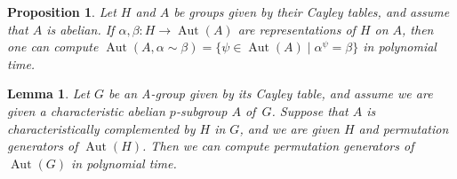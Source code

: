 \documentclass[10pt,a4paper]{amsart}
\newtheorem{proposition}{Proposition}
\newtheorem{lemma}{Lemma}
\DeclareMathOperator{\Aut}{Aut}
\begin{document}
\begin{proposition}\label{pbot}
	Let \( H \) and \( A \) be groups given by their Cayley tables, and assume that \( A \) is abelian.
	If \( \alpha, \beta : H \to \Aut(A) \) are representations of \( H \) on \( A \), then one can compute
	\( \Aut(A,\alpha \sim \beta) = \{ \psi \in \Aut(A) \mid \alpha^\psi = \beta \} \) in polynomial time.
\end{proposition}

\begin{lemma}\label{lred}
	Let \( G \) be an A-group given by its Cayley table, and assume we are given a characteristic
	abelian \( p \)-subgroup \( A \) of~\( G \). Suppose that \( A \) is characteristically complemented by \( H \) in \( G \),
	and we are given \( H \) and permutation generators of \( \Aut(H) \).
	Then we can compute permutation generators of \( \Aut(G) \) in polynomial time.
\end{lemma}
\end{document}
